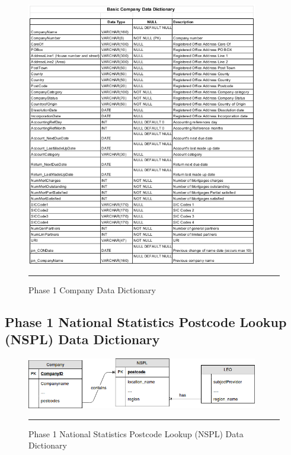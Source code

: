 \begin{figure}[H]
	\centering	
	\includegraphics[width=0.9\textwidth]{Data-Dictionary/company-data-dictionary.png}
	\rule{35em}{0.5pt}
	\caption[Phase 1 Company Data Dictionary]{Phase 1 Company Data Dictionary}
\end{figure}

\subsection{Phase 1 National Statistics Postcode Lookup (NSPL) Data Dictionary}

\begin{figure}[H]
	\centering
	\includegraphics[width=0.9\textwidth]{Figure/erd-data.png}
	\rule{35em}{0.5pt}
	\caption[Phase 1 National Statistics Postcode Lookup (NSPL) Data Dictionary]{Phase 1 National Statistics Postcode Lookup (NSPL) Data Dictionary}
\end{figure}

